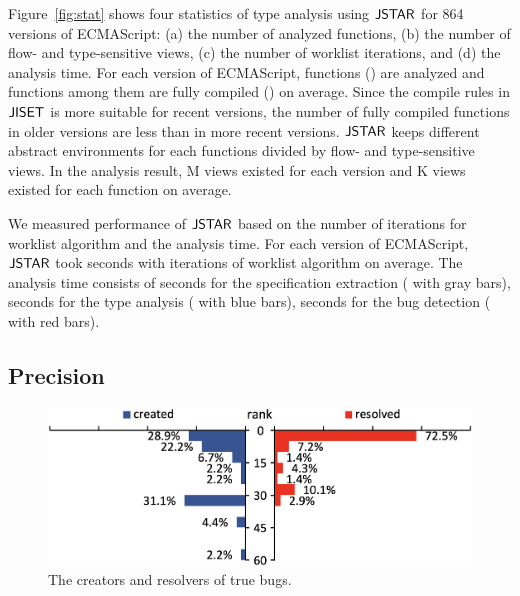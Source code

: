 Figure~\ref{fig:stat} shows four statistics of type analysis using $\tool$ for
864 versions of ECMAScript: (a) the number of analyzed functions, (b) the number
of flow- and type-sensitive views, (c) the number of worklist iterations, and
(d) the analysis time.  For each version of ECMAScript, 
functions () are analyzed and  functions among them
are fully compiled () on average.  Since the compile rules in
$\jiset$ is more suitable for recent versions, the number of fully compiled
functions in older versions are less than in more recent versions.  $\tool$
keeps different abstract environments for each functions divided by flow- and
type-sensitive views.  In the analysis result, M views existed for
each version and K views existed for each function on average.

We measured performance of $\tool$ based on the number of iterations for
worklist algorithm and the analysis time.  For each version of ECMAScript,
$\tool$ took  seconds with  iterations of worklist
algorithm on average.  The analysis time consists of  seconds for
the specification extraction ( with gray bars), 
seconds for the type analysis ( with blue bars), 
seconds for the bug detection ( with red bars).


\subsection{Precision}\label{sec:precision}

\begin{figure}
  \centering
  \includegraphics[width=\columnwidth]{img/author}
  \caption{The creators and resolvers of true bugs.}
  \label{fig:author}
  \vspace*{-1.5em}
\end{figure}

